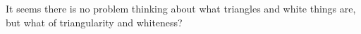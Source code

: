 It seems there is no problem thinking about what triangles and white things are, but what of triangularity and whiteness?